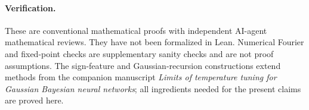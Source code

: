 \documentclass[11pt]{article}
\begin{document}
\paragraph{Verification.}
These are conventional mathematical proofs with independent AI-agent mathematical reviews. They have not been formalized in Lean. Numerical Fourier and fixed-point checks are supplementary sanity checks and are not proof assumptions. The sign-feature and Gaussian-recursion constructions extend methods from the companion manuscript \emph{Limits of temperature tuning for Gaussian Bayesian neural networks}; all ingredients needed for the present claims are proved here.
\end{document}
